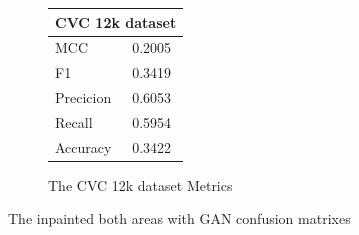 \begin{figure}
\begin{subfigure}[b]{0.25\textwidth}
        \begin{tabular}{ll}
        \toprule
        \multicolumn{2}{c}{CVC 12k dataset}        \\
        \midrule
        MCC 		& 0.2005 \\
        F1  		& 0.3419 \\
        Precicion  	& 0.6053 \\
        Recall     	& 0.5954 \\
        Accuracy	& 0.3422 \\
        \bottomrule
        \end{tabular}
\caption{The CVC 12k dataset Metrics}
\label{tab:cvc12k_metrics_DN121_GAN_BOTH}
\end{subfigure}
\caption{The inpainted both areas with GAN confusion matrixes}
\label{fig:results_DN121_GAN_BOTH}
\end{figure}
\FloatBarrier



